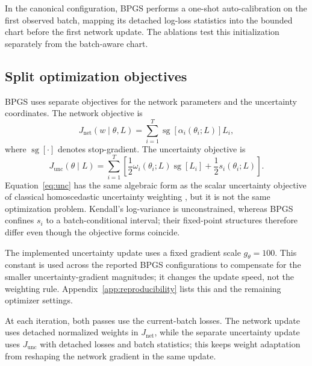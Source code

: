 In the canonical configuration, BPGS performs a one-shot auto-calibration on the first observed batch,
mapping its detached log-loss statistics into the bounded chart before the first network update. The
ablations test this initialization separately from the batch-aware chart.

\subsection{Split optimization objectives}
BPGS uses separate objectives for the network parameters and the uncertainty coordinates. The network objective is
\begin{equation}
J_{\mathrm{net}}(w \mid \theta, L)
=
\sum_{i=1}^{T} \operatorname{sg}\!\left[\alpha_i(\theta_i;L)\right] L_i,
\end{equation}
where $\operatorname{sg}[\cdot]$ denotes stop-gradient. The uncertainty objective is
\begin{equation}
J_{\mathrm{unc}}(\theta \mid L)
=
\sum_{i=1}^{T}
\left[
\frac{1}{2}\omega_i(\theta_i;L)\operatorname{sg}[L_i]
+
\frac{1}{2}s_i(\theta_i;L)
\right].
\label{eq:unc}
\end{equation}
Equation~\eqref{eq:unc} has the same algebraic form as the scalar uncertainty objective of
classical homoscedastic uncertainty weighting \cite{kendall2018}, but it is not the same
optimization problem. Kendall's log-variance is unconstrained, whereas BPGS confines $s_i$ to a
batch-conditional interval; their fixed-point structures therefore differ even though the
objective forms coincide.

The implemented uncertainty update uses a fixed gradient scale $g_\theta=100$. This constant is
used across the reported BPGS configurations to compensate for the smaller uncertainty-gradient
magnitudes; it changes the update speed, not the weighting rule. Appendix~\ref{app:reproducibility}
lists this and the remaining optimizer settings.

At each iteration, both passes use the current-batch losses. The network update uses detached
normalized weights in $J_{\mathrm{net}}$, while the separate uncertainty update uses $J_{\mathrm{unc}}$
with detached losses and batch statistics; this keeps weight adaptation from reshaping the network
gradient in the same update.

